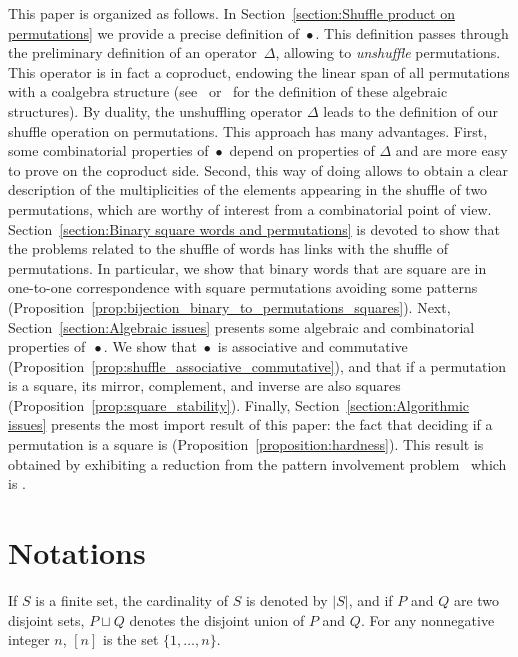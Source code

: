 \documentclass[a4paper]{llncs}
\DeclareMathOperator{\SHUFFLE}{\bullet}
\begin{document}
This paper is organized as follows. In
Section~\ref{section:Shuffle product on permutations} we provide a
precise definition of $\SHUFFLE$. This definition passes through the
preliminary definition of an operator~$\Delta$, allowing to
{\em unshuffle} permutations. This operator is in fact a coproduct,
endowing the linear span of all permutations with a coalgebra structure
(see~\cite{Joni:Rota:1979} or~\cite{Grinberg:Reiner:2014} for the
definition of these algebraic structures). By duality, the unshuffling
operator $\Delta$ leads to the definition of our shuffle operation on
permutations. This approach has many advantages. First, some
combinatorial properties of $\SHUFFLE$ depend on properties of $\Delta$
and are more easy to prove on the coproduct side. Second, this way of
doing allows to obtain a clear description of the multiplicities of the
elements appearing in the shuffle of two permutations, which are worthy
of interest from a combinatorial point of view.
Section~\ref{section:Binary square words and permutations} is devoted to
show that the problems related to the shuffle of words has links with
the shuffle of permutations. In particular, we show that binary words
that are square are in one-to-one correspondence with square
permutations avoiding some patterns
(Proposition~\ref{prop:bijection_binary_to_permutations_squares}). Next,
Section~\ref{section:Algebraic issues} presents some algebraic and
combinatorial properties of~$\SHUFFLE$. We show that $\SHUFFLE$ is
associative and commutative
(Proposition~\ref{prop:shuffle_associative_commutative}), and that if a
permutation is a square, its mirror, complement, and inverse are also
squares (Proposition~\ref{prop:square_stability}). Finally,
Section~\ref{section:Algorithmic issues} presents the most import result
of this paper: the fact that deciding if a permutation is a square is
\NPC (Proposition~\ref{proposition:hardness}). This result is obtained
by exhibiting a reduction from the pattern involvement
problem~\cite{Bose:Buss:Lubiw:1998} which is \NPC.


\section{Notations}
\label{section:Notations}

If $S$ is a finite set, the cardinality of $S$ is denoted by $|S|$,
and if $P$ and $Q$ are two disjoint sets, $P \sqcup Q$ denotes the
disjoint union of $P$ and $Q$. For any nonnegative integer $n$, $[n]$
is the set $\{1, \dots, n\}$.
\end{document}
